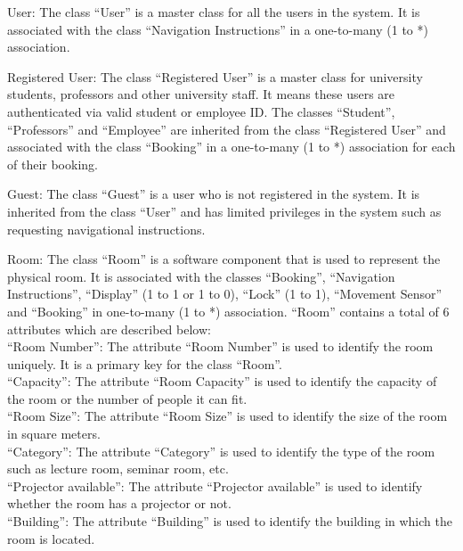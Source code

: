 \documentclass[article,onecolumn]{IEEEtran}
\begin{document}
		User: The class ``User'' is a master class for all the users in the system. It is associated with the class ``Navigation Instructions'' in a one-to-many (1 to *) association.

		Registered User: The class ``Registered User'' is a master class for university students, professors and other university staff. It means these users are authenticated via valid student or employee ID. The classes ``Student'', ``Professors'' and ``Employee'' are inherited from the class ``Registered User'' and associated with the class ``Booking'' in a one-to-many (1 to *) association for each of their booking.

		Guest: The class ``Guest'' is a user who is not registered in the system. It is inherited from the class ``User'' and has limited privileges in the system such as requesting navigational instructions.


		Room: The class ``Room'' is a software component that is used to represent the physical room. It is associated with the classes ``Booking'', ``Navigation Instructions'', ``Display'' (1 to 1 or 1 to 0), ``Lock'' (1 to 1), ``Movement Sensor'' and ``Booking'' in one-to-many (1 to *) association. ``Room'' contains a total of 6 attributes which are described below:\\
		``Room Number'': The attribute ``Room Number'' is used to identify the room uniquely. It is a primary key for the class ``Room''.\\
		``Capacity'': The attribute ``Room Capacity'' is used to identify the capacity of the room or the number of people it can fit.\\
		``Room Size'': The attribute ``Room Size'' is used to identify the size of the room in square meters.\\
		``Category'': The attribute ``Category'' is used to identify the type of the room such as lecture room, seminar room, etc.\\
		``Projector available'': The attribute ``Projector available'' is used to identify whether the room has a projector or not.\\
		``Building'': The attribute ``Building'' is used to identify the building in which the room is located.


\end{document}

